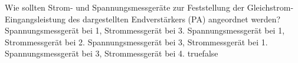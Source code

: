     {Wie sollten Strom- und Spannungsmessgeräte zur Feststellung der Gleichstrom-Eingangsleistung des dargestellten Endverstärkers (PA) angeordnet werden?}
    {Spannungsmessgerät bei 1, Strommessgerät bei 3.}
    {Spannungsmessgerät bei 1, Strommessgerät bei 2.}
    {Spannungsmessgerät bei 3, Strommessgerät bei 1.}
    {Spannungsmessgerät bei 3, Strommessgerät bei 4.}
    {true}{false}